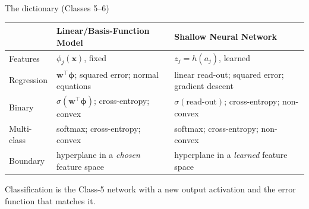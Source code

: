 \documentclass[aspectratio=169, 11pt]{beamer}
\newcommand{\nosrc}{}       %
\begin{document}
\begin{frame}{The dictionary (Classes 5--6)}
  \nosrc
  \centering
  \renewcommand{\arraystretch}{1.12}
  {\footnotesize
  \begin{tabular}{p{} p{}
                  p{}}
    & \textbf{\color{mlc}Linear/Basis-Function Model}
    & \textbf{\color{nnc}Shallow Neural Network}\\
    \hline
    Features
      & $\phi_j(\mathbf{x})$, fixed
      & $z_j = h(a_j)$, learned\\
    Regression
      & $\mathbf{w}^{\!\top}\boldsymbol{\phi}$; squared error;
        normal equations
      & linear read-out; squared error; gradient descent\\
    Binary
      & $\sigma(\mathbf{w}^{\!\top}\boldsymbol{\phi})$;
        cross-entropy; convex
      & $\sigma(\text{read-out})$; cross-entropy; non-convex\\
    Multi-class
      & softmax; cross-entropy; convex
      & softmax; cross-entropy; non-convex\\
    Boundary
      & hyperplane in a \emph{chosen} feature space
      & hyperplane in a \emph{learned} feature space\\
    \hline
  \end{tabular}}
  \vspace{0.6em}
  \begin{redhighlight}
    Classification is the Class-5 network with a new output
    activation and the error function that matches it.
  \end{redhighlight}
\end{frame}
\end{document}
